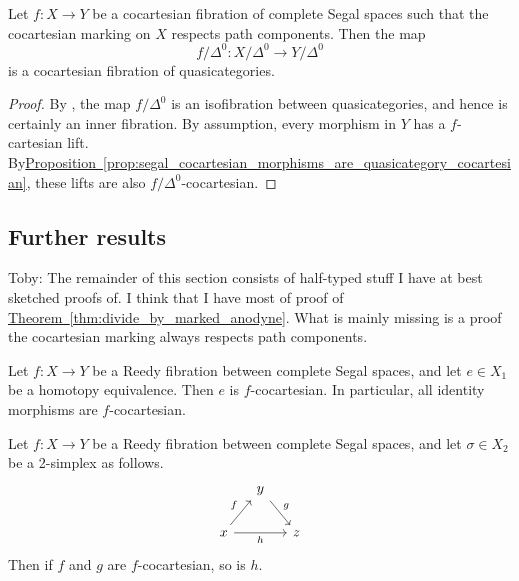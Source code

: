 \documentclass[main.tex]{subfiles}
\begin{document}
\begin{corollary}
  \label{cor:cocart_fib_between_css_gives_cocart_fib_of_quasicats}
  Let $f\colon X \to Y$ be a cocartesian fibration of complete Segal spaces such that the cocartesian marking on $X$ respects path components. Then the map
  \begin{equation*}
    f/\Delta^{0}\colon X/\Delta^{0} \to Y/\Delta^{0}
  \end{equation*}
  is a cocartesian fibration of quasicategories.
\end{corollary}
\begin{proof}
  By \cite{qcats_vs_segal_spaces}, the map $f/\Delta^{0}$ is an isofibration between quasicategories, and hence is certainly an inner fibration. By assumption, every morphism in $Y$ has a $f$-cartesian lift. By\hyperref[prop:segal_cocartesian_morphisms_are_quasicategory_cocartesian]{Proposition~\ref*{prop:segal_cocartesian_morphisms_are_quasicategory_cocartesian}}, these lifts are also $f / \Delta^{0}$-cocartesian.
\end{proof}

\subsection{Further results}
\label{ssc:further_results}

\begin{note}
  Toby: The remainder of this section consists of half-typed stuff I have at best sketched proofs of. I think that I have most of proof of \hyperref[thm:divide_by_marked_anodyne]{Theorem~\ref*{thm:divide_by_marked_anodyne}}. What is mainly missing is a proof the cocartesian marking always respects path components.
\end{note}

\begin{lemma}
  Let $f\colon X \to Y$ be a Reedy fibration between complete Segal spaces, and let $e \in X_{1}$ be a homotopy equivalence. Then $e$ is $f$-cocartesian. In particular, all identity morphisms are $f$-cocartesian.
\end{lemma}

\begin{lemma}
  \label{lemma:cocartesian_closed_under_composition}
  Let $f\colon X \to Y$ be a Reedy fibration between complete Segal spaces, and let $\sigma \in X_{2}$ be a 2-simplex as follows.
  \begin{equation*}
    \begin{tikzcd}[column sep=small]
      & y
      \arrow[dr, "g"]
      \\
      x
      \arrow[ur, "f"]
      \arrow[rr, swap, "h"]
      && z
    \end{tikzcd}
  \end{equation*}
  Then if $f$ and $g$ are $f$-cocartesian, so is $h$.
\end{lemma}
\end{document}
